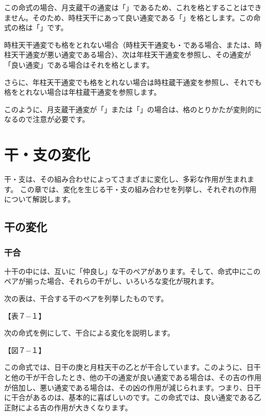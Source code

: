 \documentclass[a5paper,11pt,dvipdfmx]{tarticle}
\begin{document}
この命式の場合、月支蔵干の通変は「」であるため、これを格とすることはできません。そのため、時柱天干にあって良い通変である「」を格とします。この命式の格は「」です。

時柱天干通変でも格をとれない場合（時柱天干通変も・である場合、または、時柱天干通変が悪い通変である場合）、次は年柱天干通変を参照し、その通変が「良い通変」である場合はそれを格とします。

さらに、年柱天干通変でも格をとれない場合は時柱蔵干通変を参照し、それでも格をとれない場合は年柱蔵干通変を参照します。

このように、月支蔵干通変が「」または「」の場合は、格のとりかたが変則的になるので注意が必要です。



\clearpage

\section{干・支の変化}

干・支は、その組み合わせによってさまざまに変化し、多彩な作用が生まれます。
この章では、変化を生じる干・支の組み合わせを列挙し、それぞれの作用について解説します。

\subsection{干の変化}

\subsubsection*{干合}
十干の中には、互いに「仲良し」な干のペアがあります。そして、命式中にこのペアが揃った場合、それらの干がし、いろいろな変化が現れます。

次の表は、干合する干のペアを列挙したものです。

【表７−１】

次の命式を例にして、干合による変化を説明します。

【図７−１】

この命式では、日干の庚と月柱天干の乙とが干合しています。このように、日干と他の干が干合したとき、他の干の通変が良い通変である場合は、その吉の作用が倍加し、悪い通変である場合は、その凶の作用が減じられます。つまり、日干に干合があるのは、基本的に喜ばしいのです。この命式では、良い通変である乙正財による吉の作用が大きくなります。
\end{document}
